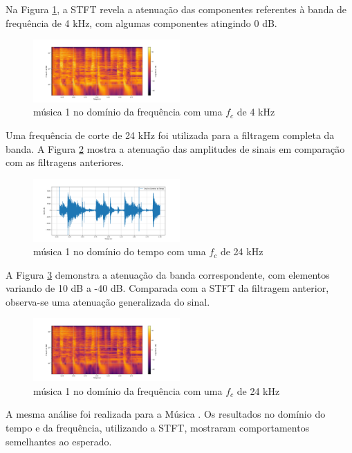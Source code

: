 Na Figura \ref{fig27}, a STFT revela a atenuação das componentes referentes à banda de frequência de 4 kHz, com algumas componentes atingindo 0 dB.

\begin{figure}[h]
	\centering
    \includegraphics[width=0.5\textwidth]{figuras/fig27.png}
	\caption{música 1 no domínio da frequência com uma $f_c$ de 4 kHz}
	\label{fig27}
\end{figure}

Uma frequência de corte de 24 kHz foi utilizada para a filtragem completa da banda. A Figura \ref{fig30} mostra a atenuação das amplitudes de sinais em comparação com as filtragens anteriores.

\begin{figure}[h]
	\centering
    \includegraphics[width=0.5\textwidth]{figuras/fig30.png}
	\caption{música 1 no domínio do tempo com uma $f_c$ de 24 kHz}
	\label{fig30}
\end{figure}

A Figura \ref{fig31} demonstra a atenuação da banda correspondente, com elementos variando de 10 dB a -40 dB. Comparada com a STFT da filtragem anterior, observa-se uma atenuação generalizada do sinal.

\begin{figure}[h]
	\centering
    \includegraphics[width=0.5\textwidth]{figuras/fig31.png}
	\caption{música 1 no domínio da frequência com uma $f_c$ de 24 kHz}
	\label{fig31}
\end{figure}

A mesma análise foi realizada para a Música \cite{track02}. Os resultados no domínio do tempo e da frequência, utilizando a STFT, mostraram comportamentos semelhantes ao esperado.

